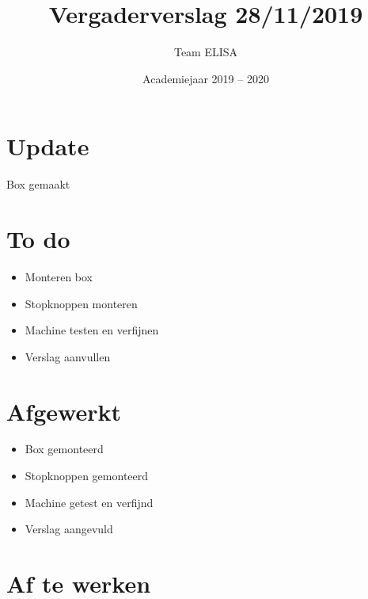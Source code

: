 \documentclass[a4paper,kulak]{kulakarticle} %
\date{Academiejaar 2019 -- 2020}
\title{Vergaderverslag 28/11/2019}
\author{Team ELISA}
\begin{document}
	
	\maketitle
	\section*{Update}
	Box gemaakt
	\section*{To do}
		\begin{itemize}
			\item Monteren box
			\item Stopknoppen monteren
			\item Machine testen en verfijnen
			\item Verslag aanvullen
		\end{itemize}
	
	\section*{Afgewerkt}
		\begin{itemize}
			\item Box gemonteerd
			\item Stopknoppen gemonteerd
			\item Machine getest en verfijnd
			\item Verslag aangevuld
		\end{itemize}
	
	
	
	\section*{Af te werken}
	
	
	
\end{document}
